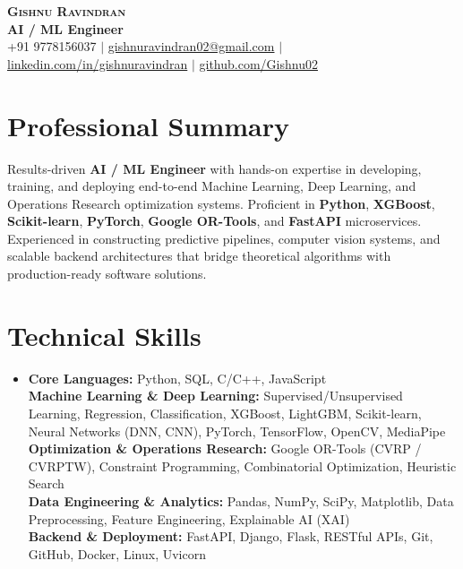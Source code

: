 \documentclass[letterpaper,9.5pt]{article}
\begin{document}
\begin{center}
    {\LARGE \textbf{\scshape Gishnu Ravindran}} \\ \vspace{2pt}
    {\normalsize \textbf{\color{NavyBlue} AI / ML Engineer}} \\ \vspace{3pt}
    \small{
      +91 9778156037 \enspace$|$\enspace 
      \href{mailto:gishnuravindran02@gmail.com}{gishnuravindran02@gmail.com} \enspace$|$\enspace 
      \href{https://linkedin.com/in/gishnuravindran}{linkedin.com/in/gishnuravindran} \enspace$|$\enspace 
      \href{https://github.com/Gishnu02}{github.com/Gishnu02}
    }
\end{center}
\vspace{-10pt}

\section{Professional Summary}
\small{
Results-driven \textbf{AI / ML Engineer} with hands-on expertise in developing, training, and deploying end-to-end Machine Learning, Deep Learning, and Operations Research optimization systems. Proficient in \textbf{Python}, \textbf{XGBoost}, \textbf{Scikit-learn}, \textbf{PyTorch}, \textbf{Google OR-Tools}, and \textbf{FastAPI} microservices. Experienced in constructing predictive pipelines, computer vision systems, and scalable backend architectures that bridge theoretical algorithms with production-ready software solutions.
}

\section{Technical Skills}
\begin{itemize}[leftmargin=0pt, label={}]
    \item \small{
     \textbf{Core Languages:}{ Python, SQL, C/C++, JavaScript} \\
     \textbf{Machine Learning \& Deep Learning:}{ Supervised/Unsupervised Learning, Regression, Classification, XGBoost, LightGBM, Scikit-learn, Neural Networks (DNN, CNN), PyTorch, TensorFlow, OpenCV, MediaPipe} \\
     \textbf{Optimization \& Operations Research:}{ Google OR-Tools (CVRP / CVRPTW), Constraint Programming, Combinatorial Optimization, Heuristic Search} \\
     \textbf{Data Engineering \& Analytics:}{ Pandas, NumPy, SciPy, Matplotlib, Data Preprocessing, Feature Engineering, Explainable AI (XAI)} \\
     \textbf{Backend \& Deployment:}{ FastAPI, Django, Flask, RESTful APIs, Git, GitHub, Docker, Linux, Uvicorn}
    }
\end{itemize}
\vspace{-7pt}
\end{document}
